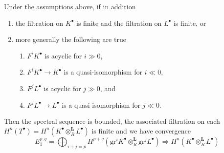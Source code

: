 \begin{lemma}
\label{lemma-kunneth-converges}
Under the assumptions above, if in addition
\begin{enumerate}
\item the filtration on $K^\bullet$ is finite and the filtration on
$L^\bullet$ is finite, or
\item more generally the following are true
\begin{enumerate}
\item $F^iK^\bullet$ is acyclic for $i \gg 0$,
\item $F^iK^\bullet \to K^\bullet$ is a quasi-isomorphism for $i \ll 0$,
\item $F^jL^\bullet$ is acyclic for $j \gg 0$, and
\item $F^jL^\bullet \to L^\bullet$ is a quasi-isomorphism for $j \ll 0$.
\end{enumerate}
\end{enumerate}
Then the spectral sequence is bounded, the associated filtration on each
$H^n(T^\bullet) = H^n(K^\bullet \otimes_R^\mathbf{L} L^\bullet)$ is finite
and we have convergence
$$
E_1^{p, q} =
\bigoplus\nolimits_{i + j = p}
H^{p + q}(\text{gr}^iK^\bullet \otimes_R^\mathbf{L} \text{gr}^jL^\bullet)
\Rightarrow
H^n(K^\bullet \otimes_R^\mathbf{L} L^\bullet)
$$
\end{lemma}

